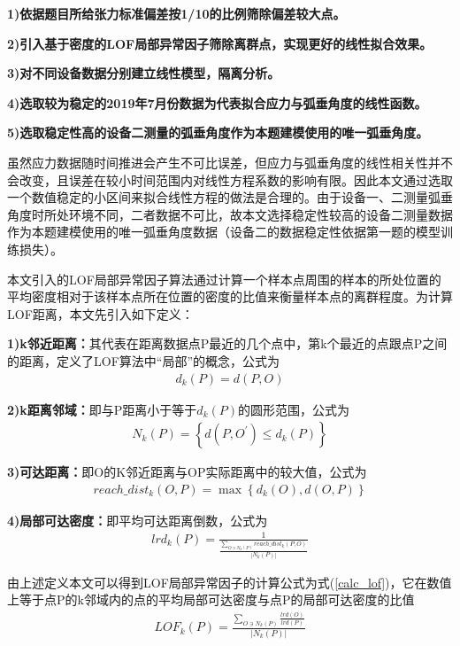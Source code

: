 \documentclass[withoutpreface,bwprint]{cumcmthesis}  %
\begin{document}
        \textbf{1)依据题目所给张力标准偏差按1/10的比例筛除偏差较大点。}

        \textbf{2)引入基于密度的LOF局部异常因子筛除离群点，实现更好的线性拟合效果。}

        \textbf{3)对不同设备数据分别建立线性模型，隔离分析。}

        \textbf{4)选取较为稳定的2019年7月份数据为代表拟合应力与弧垂角度的线性函数。}

        \textbf{5)选取稳定性高的设备二测量的弧垂角度作为本题建模使用的唯一弧垂角度。}

        虽然应力数据随时间推进会产生不可比误差，但应力与弧垂角度的线性相关性并不会改变，且误差在较小时间范围内对线性方程系数的影响有限。因此本文通过选取一个数值稳定的小区间来拟合线性方程的做法是合理的。由于设备一、二测量弧垂角度时所处环境不同，二者数据不可比，故本文选择稳定性较高的设备二测量数据作为本题建模使用的唯一弧垂角度数据（设备二的数据稳定性依据第一题的模型训练损失）。

        本文引入的LOF局部异常因子算法通过计算一个样本点周围的样本的所处位置的平均密度相对于该样本点所在位置的密度的比值来衡量样本点的离群程度。为计算LOF距离，本文先引入如下定义：

        \textbf{1)k邻近距离：}其代表在距离数据点P最近的几个点中，第k个最近的点跟点P之间的距离，定义了LOF算法中“局部”的概念，公式为
        \begin{align}
            d_{k}(P)=d(P,O)
        \end{align}
        
        \textbf{2)k距离邻域：}即与P距离小于等于$d_{k}(P)$的圆形范围，公式为
        \begin{align}
            N_{k}(P)=\left \{d(P,O^{\prime })\le d_{k}(P)\right \}
        \end{align}

        \textbf{3)可达距离：}即O的K邻近距离与OP实际距离中的较大值，公式为
        \begin{align}
            reach\_dist_{k}(O, P)=\max \left\{d_{k}(O), d(O, P)\right\}
        \end{align}

        \textbf{4)局部可达密度：}即平均可达距离倒数，公式为
        \begin{align}
            lrd_{k}(P)=\frac{1}{\frac{\sum_{O \ni N_{k}(P)} r e a c h \_  dist_{k}(P, O)}{\left|N_{k}(P)\right|}}
        \end{align}

        由上述定义本文可以得到LOF局部异常因子的计算公式为式(\ref{calc_lof})，它在数值上等于点P的k邻域内的点的平均局部可达密度与点P的局部可达密度的比值
        \begin{align}
            LOF_{k}(P)=\frac{\sum_{O \ni N_{k}(P)} \frac{lrd(O)}{lrd(P)} }{\left|N_{k}(P)\right|}
            \label{calc_lof}
        \end{align}
\end{document}
